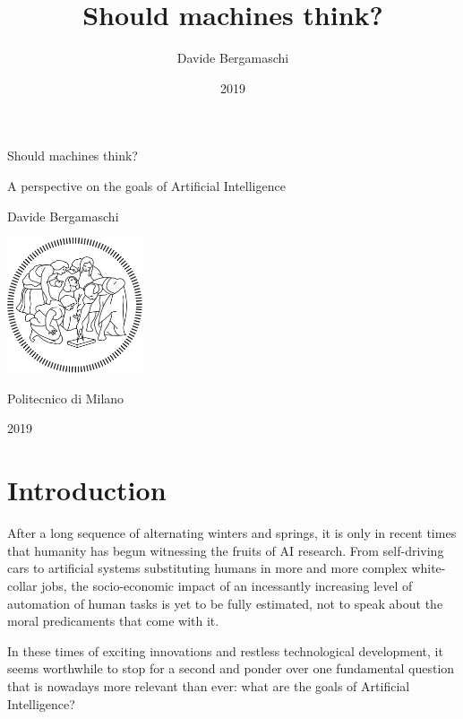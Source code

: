 \documentclass{article}
\title  {Should machines think?}
\author {Davide Bergamaschi}
\date   {2019}
\begin{document}
\begin{titlepage}
   \begin{center}
       \vspace*{1cm}

       \huge Should machines think?

       \vspace{0.3cm}

       \LARGE A perspective on the goals of Artificial Intelligence

       \vspace{3cm}

       \Large Davide Bergamaschi

       \vfill

       \includegraphics[width=0.3\textwidth]{logo.png}

       \vspace{0.5cm}

       Politecnico di Milano

       2019

       \vspace{1cm}
   \end{center}
\end{titlepage}

\section{Introduction}

After a long sequence of alternating winters and springs, it is only in recent times that humanity has begun witnessing the fruits of AI research. From self-driving cars to artificial systems substituting humans in more and more complex white-collar jobs, the socio-economic impact of an incessantly increasing level of automation of human tasks is yet to be fully estimated, not to speak about the moral predicaments that come with it.

In these times of exciting innovations and restless technological development, it seems worthwhile to stop for a second and ponder over one fundamental question that is nowadays more relevant than ever: what are the goals of Artificial Intelligence?
\end{document}
